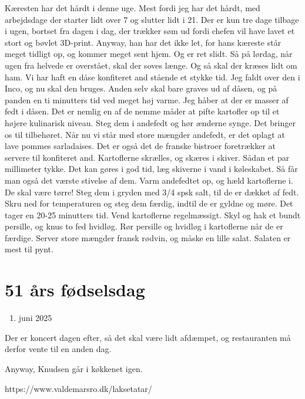\documentclass[
  letterpaper,
  DIV=11,
  numbers=noendperiod]{scrreprt}
\providecommand{\tightlist}{%
  \setlength{\itemsep}{0pt}\setlength{\parskip}{0pt}}\usepackage{longtable,booktabs,array}
\begin{document}
Kæresten har det hårdt i denne uge. Mest fordi jeg har det hårdt, med
arbejdsdage der starter lidt over 7 og slutter lidt i 21. Der er kun tre
dage tilbage i ugen, bortset fra dagen i dag, der trækker søm ud fordi
chefen vil have lavet et stort og bøvlet 3D-print. Anyway, han har det
ikke let, for hans kæreste står meget tidligt op, og kommer meget sent
hjem. Og er ret slidt. Så på lørdag, når ugen fra helvede er overstået,
skal der soves længe. Og så skal der kræses lidt om ham. Vi har haft en
dåse konfiteret and stående et stykke tid. Jeg faldt over den i Inco, og
nu skal den bruges. Anden selv skal bare graves ud af dåsen, og på
panden en ti minutters tid ved meget høj varme. Jeg håber at der er
masser af fedt i dåsen. Det er nemlig en af de nemme måder at pifte
kartofler op til et højere kulinarisk niveau. Steg dem i andefedt og hør
ænderne synge. Det bringer os til tilbehøret. Når nu vi står med store
mængder andefedt, er det oplagt at lave pommes sarladaises. Det er også
det de franske bistroer foretrækker at servere til konfiteret and.
Kartoflerne skrælles, og skæres i skiver. Sådan et par millimeter tykke.
Det kan gøres i god tid, læg skiverne i vand i køleskabet. Så får man
også det værste stivelse af dem. Varm andefedtet op, og hæld kartoflerne
i. De skal være tørre! Steg dem i gryden med 3/4 spsk salt, til de er
dækket af fedt. Skru ned for temperaturen og steg dem færdig, indtil de
er gyldne og møre. Det tager en 20-25 minutters tid. Vend kartoflerne
regelmæssigt. Skyl og hak et bundt persille, og knus to fed hvidløg. Rør
persille og hvidløg i kartoflerne når de er færdige. Server store
mængder fransk rødvin, og måske en lille salat. Salaten er mest til
pynt.

\hypertarget{uxe5rs-fuxf8dselsdag}{%
\section{51 års fødselsdag}\label{uxe5rs-fuxf8dselsdag}}

\begin{enumerate}
\def\labelenumi{\arabic{enumi}.}
\setcounter{enumi}{19}
\tightlist
\item
  juni 2025
\end{enumerate}

Der er koncert dagen efter, så det skal være lidt afdæmpet, og
restauranten må derfor vente til en anden dag.

Anyway, Knudsen går i køkkenet igen.

https://www.valdemarsro.dk/laksetatar/
\end{document}
